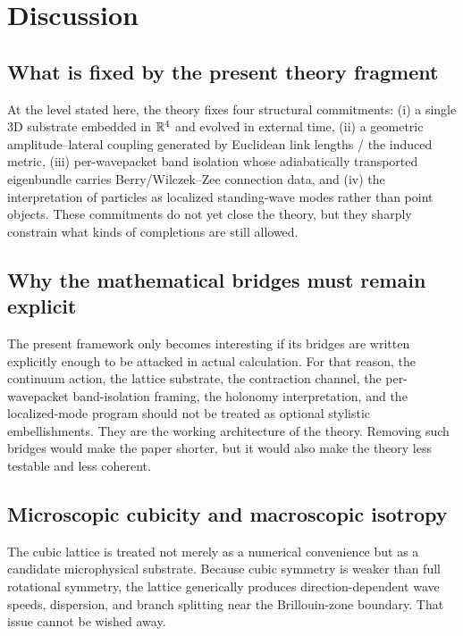 \section{Discussion}
\label{sec:discussion}

\subsection{What is fixed by the present theory fragment}

At the level stated here, the theory fixes four structural commitments:
(i) a single 3D substrate embedded in $\mathbb{R}^4$ and evolved in external time,
(ii) a geometric amplitude--lateral coupling generated by Euclidean link lengths / the induced metric,
(iii) per-wavepacket band isolation whose adiabatically transported eigenbundle carries Berry/Wilczek--Zee connection data,
and (iv) the interpretation of particles as localized standing-wave modes rather than point objects.
These commitments do not yet close the theory, but they sharply constrain what kinds of completions are still allowed.

\subsection{Why the mathematical bridges must remain explicit}

The present framework only becomes interesting if its bridges are written explicitly enough to be attacked in actual
calculation.
For that reason, the continuum action, the lattice substrate, the contraction channel, the per-wavepacket band-isolation
framing, the holonomy interpretation, and the localized-mode program should not be treated as optional stylistic
embellishments.
They are the working architecture of the theory.
Removing such bridges would make the paper shorter, but it would also make the theory less testable and less coherent.

\subsection{Microscopic cubicity and macroscopic isotropy}
\label{subsec:discussion-lattice}

The cubic lattice is treated not merely as a numerical convenience but as a candidate microphysical substrate.
Because cubic symmetry is weaker than full rotational symmetry, the lattice generically produces direction-dependent
wave speeds, dispersion, and branch splitting near the Brillouin-zone boundary.
That issue cannot be wished away.

